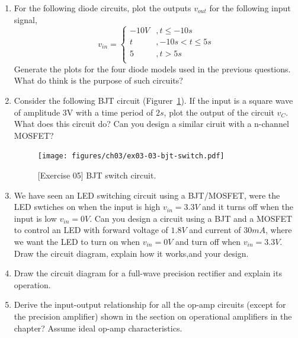\begin{enumerate}
    \item For the following diode circuits, plot the outputs $v_{out}$ for the following input signal,
    \[ v_{in} = \begin{cases}
        -10V &, t \leq -10s \\
        t &, -10s < t \leq 5s \\
        5 &, t > 5s \\
        \end{cases} \]
    Generate the plots for the four diode models used in the previous questions. What do think is the purpose of such circuits?

    \item Consider the following BJT circuit (Figurer~\ref{fig:ex03-03}). If the input is a square wave of amplitude 3V with a time period of $2s$, plot the output of the circuit $v_C$. What does this circuit do? Can you design a similar ciruit with a n-channel MOSFET?
    \begin{figure}[htbp]
        \centering
        \texttt{[image: figures/ch03/ex03-03-bjt-switch.pdf]}
        \caption{[Exercise 05] BJT switch circuit.}
        \label{fig:ex03-03}
    \end{figure}

    \item We have seen an LED switching circuit using a BJT/MOSFET, were the LED swtiches on when the input is high $v_{in} = 3.3V$ and it turns off when the input is low $v_{in} = 0V$. Can you design a circuit using a BJT and a MOSFET to control an LED with forward voltage of $1.8V$ and current of $30mA$, where we want the LED to turn on when $v_{in} = 0V$ and turn off when $v_{in} = 3.3V$. Draw the circuit diagram, explain how it works,and your design.
    
    \item Draw the circuit diagram for a full-wave precision rectifier and explain its operation.
    
    \item Derive the input-output relationship for all the op-amp circuits (except for the precision amplifier) shown in the section on operational amplifiers in the chapter? Assume ideal op-amp characteristics.
\end{enumerate}
